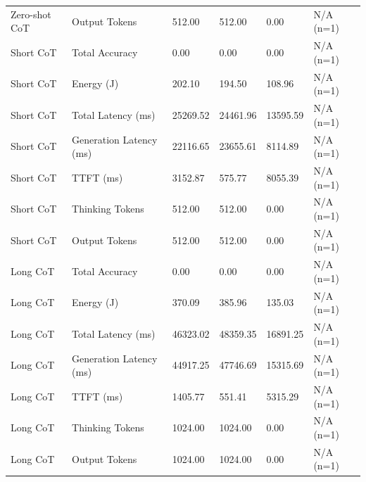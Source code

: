 \begin{table}
\begin{tabular}{llllll}
Zero-shot CoT & Output Tokens & 512.00 & 512.00 & 0.00 & N/A (n=1) \\
Short CoT & Total Accuracy & 0.00 & 0.00 & 0.00 & N/A (n=1) \\
Short CoT & Energy (J) & 202.10 & 194.50 & 108.96 & N/A (n=1) \\
Short CoT & Total Latency (ms) & 25269.52 & 24461.96 & 13595.59 & N/A (n=1) \\
Short CoT & Generation Latency (ms) & 22116.65 & 23655.61 & 8114.89 & N/A (n=1) \\
Short CoT & TTFT (ms) & 3152.87 & 575.77 & 8055.39 & N/A (n=1) \\
Short CoT & Thinking Tokens & 512.00 & 512.00 & 0.00 & N/A (n=1) \\
Short CoT & Output Tokens & 512.00 & 512.00 & 0.00 & N/A (n=1) \\
Long CoT & Total Accuracy & 0.00 & 0.00 & 0.00 & N/A (n=1) \\
Long CoT & Energy (J) & 370.09 & 385.96 & 135.03 & N/A (n=1) \\
Long CoT & Total Latency (ms) & 46323.02 & 48359.35 & 16891.25 & N/A (n=1) \\
Long CoT & Generation Latency (ms) & 44917.25 & 47746.69 & 15315.69 & N/A (n=1) \\
Long CoT & TTFT (ms) & 1405.77 & 551.41 & 5315.29 & N/A (n=1) \\
Long CoT & Thinking Tokens & 1024.00 & 1024.00 & 0.00 & N/A (n=1) \\
Long CoT & Output Tokens & 1024.00 & 1024.00 & 0.00 & N/A (n=1) \\
\bottomrule
\end{tabular}
\end{table}
